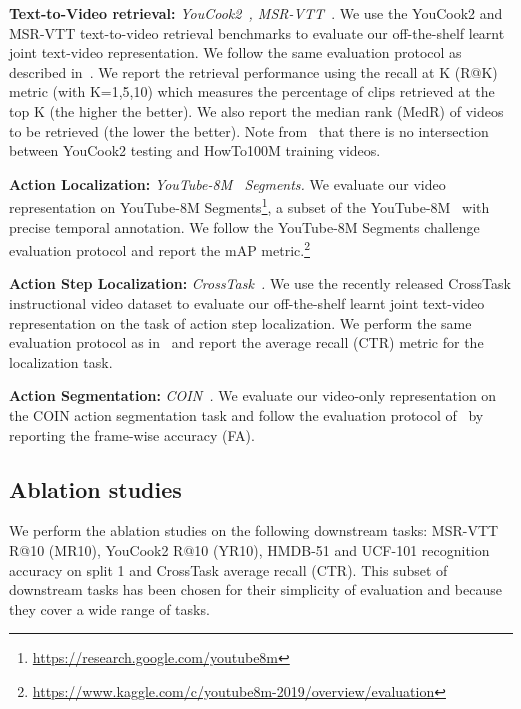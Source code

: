 \documentclass[10pt,twocolumn,letterpaper]{article}
\newcommand{\rYC}{YR10}
\newcommand{\rMSRVTT}{MR10}
\newcommand{\rCrossTask}{CTR}
\newcommand{\rCOIN}{FA}
\begin{document}
\noindent
\textbf{Text-to-Video retrieval:} \textit{YouCook2~\cite{youcook2}, MSR-VTT~\cite{xu16msrvtt}}. We use the YouCook2 and MSR-VTT text-to-video retrieval benchmarks to evaluate our off-the-shelf learnt joint text-video representation.
We follow the same evaluation protocol as described in~\cite{miech19howto100m}.
We report the retrieval performance using the recall at K (R@K) metric (with K=1,5,10) which measures the percentage of clips retrieved at the top K (the higher the better).
We also report the median rank (MedR) of videos to be retrieved (the lower the better).
Note from~\cite{miech19howto100m} that there is no intersection between YouCook2 testing and HowTo100M training videos.

\noindent
\textbf{Action Localization:} \textit{YouTube-8M~\cite{youtube8m} Segments.} 
We evaluate our video representation on YouTube-8M Segments\footnote{\url{https://research.google.com/youtube8m}}, a subset of the YouTube-8M~\cite{youtube8m} with precise temporal annotation.
We follow the YouTube-8M Segments challenge evaluation protocol and report the mAP metric.\footnote{\url{https://www.kaggle.com/c/youtube8m-2019/overview/evaluation}}

\noindent
\textbf{Action Step Localization:} \textit{CrossTask~\cite{zhukov2019crosstask}.} We use the recently released CrossTask instructional video dataset
to evaluate our off-the-shelf learnt joint text-video representation on the task of action step localization. 
We perform the same evaluation protocol as in~\cite{zhukov2019crosstask} and report the average recall (\rCrossTask) metric for the localization task.

\noindent
\textbf{Action Segmentation:} \textit{COIN~\cite{tang2019coin}.} 
We evaluate our video-only representation on the COIN action segmentation task and follow the evaluation protocol of~\cite{sun2019contrastive} by reporting the frame-wise accuracy (\rCOIN).


\subsection{Ablation studies}
\label{subsec:ablation}
We perform the ablation studies on the following downstream tasks: MSR-VTT R@10 (\rMSRVTT), YouCook2 R@10 (\rYC), HMDB-51 and UCF-101 recognition accuracy on split 1 and CrossTask average recall (\rCrossTask). This subset of downstream tasks has been chosen for their simplicity of evaluation and because they cover a wide range of tasks.
\end{document}
